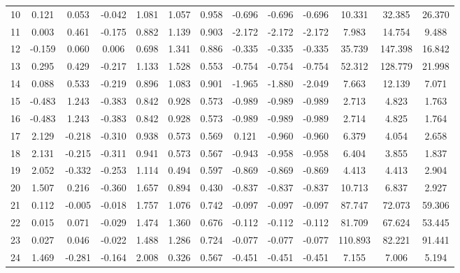 \begin{table}
\begin{tabular}{c | c c c | c c c | c c c | c c c }
            \multicolumn{1}{c|}{10} & 0.121  & 0.053  & -0.042 & 1.081 & 1.057 & 0.958 & -0.696 & -0.696 & -0.696 & 10.331  & 32.385  & 26.370 \\
            \multicolumn{1}{c|}{11} & 0.003  & 0.461  & -0.175 & 0.882 & 1.139 & 0.903 & -2.172 & -2.172 & -2.172 & 7.983   & 14.754  & 9.488  \\
            \multicolumn{1}{c|}{12} & -0.159 & 0.060  & 0.006  & 0.698 & 1.341 & 0.886 & -0.335 & -0.335 & -0.335 & 35.739  & 147.398 & 16.842 \\
            \multicolumn{1}{c|}{13} & 0.295  & 0.429  & -0.217 & 1.133 & 1.528 & 0.553 & -0.754 & -0.754 & -0.754 & 52.312  & 128.779 & 21.998 \\
            \multicolumn{1}{c|}{14} & 0.088  & 0.533  & -0.219 & 0.896 & 1.083 & 0.901 & -1.965 & -1.880 & -2.049 & 7.663   & 12.139  & 7.071  \\
            \multicolumn{1}{c|}{15} & -0.483 & 1.243  & -0.383 & 0.842 & 0.928 & 0.573 & -0.989 & -0.989 & -0.989 & 2.713   & 4.823   & 1.763  \\
            \multicolumn{1}{c|}{16} & -0.483 & 1.243  & -0.383 & 0.842 & 0.928 & 0.573 & -0.989 & -0.989 & -0.989 & 2.714   & 4.825   & 1.764  \\
            \multicolumn{1}{c|}{17} & 2.129  & -0.218 & -0.310 & 0.938 & 0.573 & 0.569 & 0.121  & -0.960 & -0.960 & 6.379   & 4.054   & 2.658  \\
            \multicolumn{1}{c|}{18} & 2.131  & -0.215 & -0.311 & 0.941 & 0.573 & 0.567 & -0.943 & -0.958 & -0.958 & 6.404   & 3.855   & 1.837  \\
            \multicolumn{1}{c|}{19} & 2.052  & -0.332 & -0.253 & 1.114 & 0.494 & 0.597 & -0.869 & -0.869 & -0.869 & 4.413   & 4.413   & 2.904  \\
            \multicolumn{1}{c|}{20} & 1.507  & 0.216  & -0.360 & 1.657 & 0.894 & 0.430 & -0.837 & -0.837 & -0.837 & 10.713  & 6.837   & 2.927  \\
            \multicolumn{1}{c|}{21} & 0.112  & -0.005 & -0.018 & 1.757 & 1.076 & 0.742 & -0.097 & -0.097 & -0.097 & 87.747  & 72.073  & 59.306 \\
            \multicolumn{1}{c|}{22} & 0.015  & 0.071  & -0.029 & 1.474 & 1.360 & 0.676 & -0.112 & -0.112 & -0.112 & 81.709  & 67.624  & 53.445 \\
            \multicolumn{1}{c|}{23} & 0.027  & 0.046  & -0.022 & 1.488 & 1.286 & 0.724 & -0.077 & -0.077 & -0.077 & 110.893 & 82.221  & 91.441 \\
            \multicolumn{1}{c|}{24} & 1.469  & -0.281 & -0.164 & 2.008 & 0.326 & 0.567 & -0.451 & -0.451 & -0.451 & 7.155   & 7.006   & 5.194 \\\bottomrule
        \end{tabular}
    \end{table}

